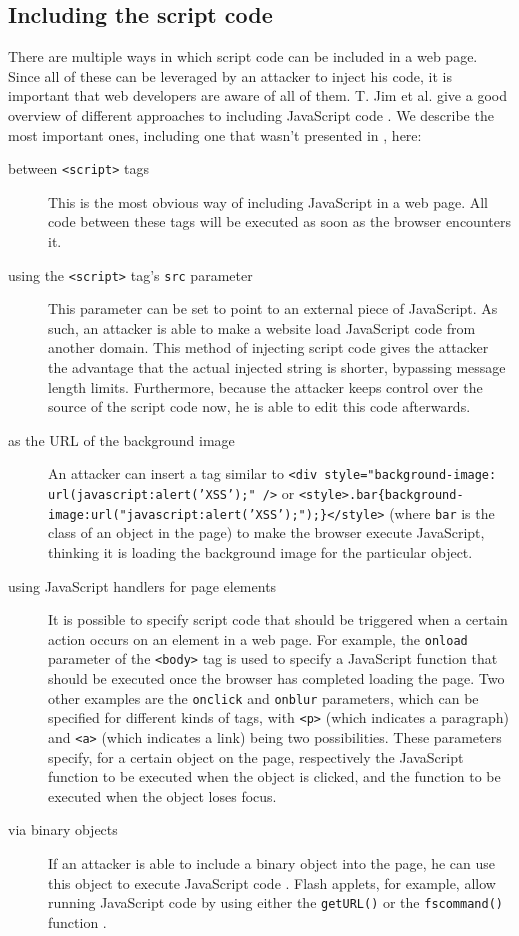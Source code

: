 \subsection{Including the script code}\label{injecting-script}
There are multiple ways in which script code can be included in a web page. Since all of these can be leveraged by an attacker to inject his code, it is important that web developers are aware of all of them. T. Jim et al. give a good overview of different approaches to including JavaScript code \cite{Jim2007}. We describe the most important ones, including one that wasn't presented in \cite{Jim2007}, here:
\begin{description}
	\item[between \texttt{<script>} tags] This is the most obvious way of including JavaScript in a web page. All code between these tags will be executed as soon as the browser encounters it.
	\item[using the \texttt{<script>} tag's \texttt{src} parameter] This parameter can be set to point to an external piece of JavaScript. As such, an attacker is able to make a website load JavaScript code from another domain. This method of injecting script code gives the attacker the advantage that the actual injected string is shorter, bypassing message length limits. Furthermore, because the attacker keeps control over the source of the script code now, he is able to edit this code afterwards.
	\item[as the URL of the background image] An attacker can insert a tag similar to \texttt{<div style="background-image: url(javascript:alert('XSS');" />} or \texttt{<style>.bar\{background-image:url("javascript:alert('XSS');");\}</style>} (where \texttt{bar} is the class of an object in the page) to make the browser execute JavaScript, thinking it is loading the background image for the particular object.
	\item[using JavaScript handlers for page elements] It is possible to specify script code that should be triggered when a certain action occurs on an element in a web page. For example, the \texttt{onload} parameter of the \texttt{<body>} tag is used to specify a JavaScript function that should be executed once the browser has completed loading the page. Two other examples are the \texttt{onclick} and \texttt{onblur} parameters, which can be specified for different kinds of tags, with \texttt{<p>} (which indicates a paragraph) and \texttt{<a>} (which indicates a link) being two possibilities. These parameters specify, for a certain object on the page, respectively the JavaScript function to be executed when the object is clicked, and the function to be executed when the object loses focus.
	\item[via binary objects] If an attacker is able to include a binary object into the page, he can use this object to execute JavaScript code \cite{Bisht2008}. Flash applets, for example, allow running JavaScript code by using either the \texttt{getURL()} or the \texttt{fscommand()} function \cite{FlashJSattack,FlashJS,FlashCookie}.
\end{description}


